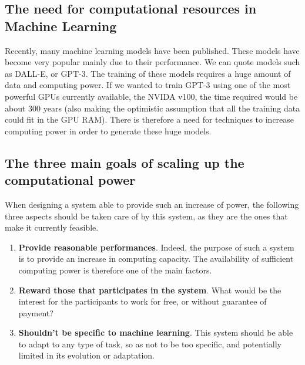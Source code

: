 \documentclass{article}
\begin{document}
\subsection{The need for computational resources in Machine Learning}
Recently, many machine learning models have been published. These models have become very popular mainly due to their
performance. We can quote models such as DALL-E, or GPT-3. The training of these models requires a huge amount of data
and computing power. If we wanted to train GPT-3 using one of the most powerful GPUs currently available,
the NVIDA v100, the time required would be about 300 years (also making the optimistic assumption that all the
training data could fit in the GPU RAM). There is therefore a need for techniques to increase computing power in order
to generate these huge models.
\subsection{The three main goals of scaling up the computational power}
When designing a system able to provide such an increase of power, the following three aspects should be taken care of
by this system, as they are the ones that make it currently feasible.
\begin{enumerate}
    \item \textbf{Provide reasonable performances}. Indeed, the purpose of such a system is to provide an increase in computing
     capacity. The availability of sufficient computing power is therefore one of the main factors.
    \item \textbf{Reward those that participates in the system}. What would be the interest for the participants to work for
     free, or without guarantee of payment?
    \item \textbf{Shouldn't be specific to machine learning}. This system should be able to adapt to any type of task, so as not
     to be too specific, and potentially limited in its evolution or adaptation.
\end{enumerate}
\end{document}

